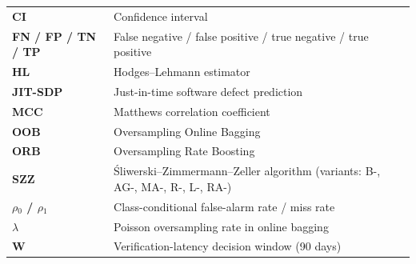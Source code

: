 \begin{longtable}[]{@{}
  >{\raggedright\arraybackslash}p{}
  >{\raggedright\arraybackslash}p{}@{}}
\toprule\noalign{}
\endhead
\bottomrule\noalign{}
\endlastfoot
\textbf{CI} & Confidence interval \\
\textbf{FN / FP / TN / TP} & False negative / false positive / true
negative / true positive \\
\textbf{HL} & Hodges--Lehmann estimator \\
\textbf{JIT-SDP} & Just-in-time software defect prediction \\
\textbf{MCC} & Matthews correlation coefficient \\
\textbf{OOB} & Oversampling Online Bagging \\
\textbf{ORB} & Oversampling Rate Boosting \\
\textbf{SZZ} & \'{S}liwerski--Zimmermann--Zeller algorithm (variants: B-,
AG-, MA-, R-, L-, RA-) \\
\textbf{\ensuremath{\rho}\ensuremath{_0} / \ensuremath{\rho}\ensuremath{_1}} & Class-conditional false-alarm rate / miss rate \\
\textbf{\ensuremath{\lambda}} & Poisson oversampling rate in online bagging \\
\textbf{W} & Verification-latency decision window (90 days) \\
\end{longtable}
